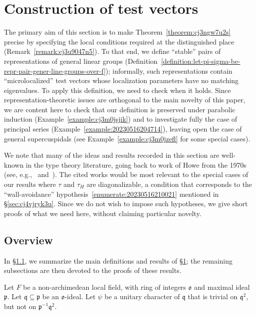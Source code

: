 \documentclass[reqno]{amsart}
\theoremstyle{plain} \newtheorem{theorem} {Theorem} \newtheorem{conjecture} {Conjecture} \newtheorem{corollary} [theorem] {Corollary} \newtheorem{proposition} [theorem] {Proposition} \newtheorem{fact} [theorem] {Fact}
\theoremstyle{definition} \newtheorem{definition} [theorem] {Definition}
\theoremstyle{itplain} %
\newcommand{\mfq}{\mathfrak{q}}
\begin{document}
\section{Construction of test vectors}\label{sec:part-body-paper}
The primary aim of this section is to make Theorem~\ref{theorem:cj3ngw7u2s} precise by specifying the local conditions required at the distinguished place (Remark~\ref{remark:cj3u9047n5}).  To that end, we define ``stable'' pairs of representations of general linear groups (Definition~\ref{definition:let-pi-sigma-be-repr-pair-gener-line-groups-over-f}); informally, such representations contain ``microlocalized'' test vectors whose localization parameters have no matching eigenvalues.  To apply this definition, we need to check when it holds.  Since representation-theoretic issues are orthogonal to the main novelty of this paper, we are content here to check that our definition is preserved under parabolic induction (Example~\ref{example:cj3m0jsjik}) and to investigate fully the case of principal series (Example~\ref{example:20230516204714}), leaving open the case of general supercuspidals (see Example~\ref{example:cj3m0jzefl} for some special cases).

We note that many of the ideas and results recorded in this section are well-known in the type theory literature, going back to work of Howe from the 1970s (see, e.g.,~\cite{MR0579176, MR0327982} and~\cite[\S5]{MR2016587}).  The cited works would be most relevant to the special cases of our results where $\tau$ and $\tau_H$ are diagonalizable, a condition that corresponds to the ``wall-avoidance'' hypothesis~\eqref{enumerate:20230516210021} mentioned in \S\ref{sec:cj4vjryk3u}.  Since we do not wish to impose such hypotheses, we give short proofs of what we need here, without claiming particular novelty.

\subsection{Overview}\label{sec:20230516194628}
In \S\ref{sec:20230516194628}, we summarize the main definitions and results of \S\ref{sec:part-body-paper}; the remaining subsections are then devoted to the proofs of these results.

Let $F$ be a non-archimedean local field, with ring of integers $\mathfrak{o}$ and maximal ideal $\mathfrak{p}$. Let $\mathfrak{q} \subseteq \mathfrak{p}$ be an $\mathfrak{o}$-ideal.  Let $\psi$ be a unitary character of $\mfq$ that is trivial on $\mfq^2$, but not on $\mathfrak{p}^{-1}\mfq^2$.
\end{document}
